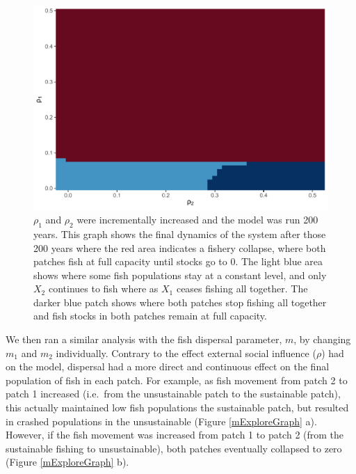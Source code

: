 \documentclass[
  12pt,
]{article}
\begin{document}
\begin{figure}
\centering
\includegraphics{Wulfing_CH2_Draft4_files/figure-latex/rhoExploreGraph-1.pdf}
\caption{\label{fig:rhoExploreGraph}\(\rho_1\) and \(\rho_2\) were incrementally increased and the model was run 200 years. This graph shows the final dynamics of the system after those 200 years where the red area indicates a fishery collapse, where both patches fish at full capacity until stocks go to 0. The light blue area shows where some fish populations stay at a constant level, and only \(X_2\) continues to fish where as \(X_1\) ceases fishing all together. The darker blue patch shows where both patches stop fishing all together and fish stocks in both patches remain at full capacity. \label{rhoExploreGraph}}
\end{figure}

We then ran a similar analysis with the fish dispersal parameter, \(m\), by changing \(m_1\) and \(m_2\) individually. Contrary to the effect external social influence (\(\rho\)) had on the model, dispersal had a more direct and continuous effect on the final population of fish in each patch. For example, as fish movement from patch 2 to patch 1 increased (i.e.~from the unsustainable patch to the sustainable patch), this actually maintained low fish populations the sustainable patch, but resulted in crashed populations in the unsustainable (Figure \ref{mExploreGraph} a). However, if the fish movement was increased from patch 1 to patch 2 (from the sustainable fishing to unsustainable), both patches eventually collapsed to zero (Figure \ref{mExploreGraph} b).
\end{document}
